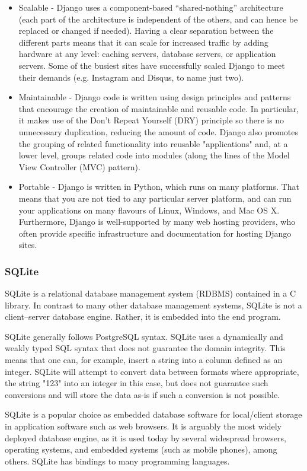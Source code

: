 \documentclass[12pt, a4paper]{report}
\begin{document}
\begin{itemize}
	\item Scalable - Django uses a component-based “shared-nothing” architecture (each part of the architecture is independent of the others, and can hence be replaced or changed if needed). Having a clear separation between the different parts means that it can scale for increased traffic by adding hardware at any level: caching servers, database servers, or application servers. Some of the busiest sites have successfully scaled Django to meet their demands (e.g. Instagram and Disqus, to name just two).
	\item Maintainable - Django code is written using design principles and patterns that encourage the creation of maintainable and reusable code. In particular, it makes use of the Don't Repeat Yourself (DRY) principle so there is no unnecessary duplication, reducing the amount of code. Django also promotes the grouping of related functionality into reusable "applications" and, at a lower level, groups related code into modules (along the lines of the Model View Controller (MVC) pattern).
	\item Portable - Django is written in Python, which runs on many platforms. That means that you are not tied to any particular server platform, and can run your applications on many flavours of Linux, Windows, and Mac OS X. Furthermore, Django is well-supported by many web hosting providers, who often provide specific infrastructure and documentation for hosting Django sites.
\end{itemize}

\subsubsection{SQLite}
SQLite is a relational database management system (RDBMS) contained in a C library. In contrast to many other database management systems, SQLite is not a client–server database engine. Rather, it is embedded into the end program.

\par SQLite generally follows PostgreSQL syntax. SQLite uses a dynamically and weakly typed SQL syntax that does not guarantee the domain integrity. This means that one can, for example, insert a string into a column defined as an integer. SQLite will attempt to convert data between formats where appropriate, the string "123" into an integer in this case, but does not guarantee such conversions and will store the data as-is if such a conversion is not possible.

\par SQLite is a popular choice as embedded database software for local/client storage in application software such as web browsers. It is arguably the most widely deployed database engine, as it is used today by several widespread browsers, operating systems, and embedded systems (such as mobile phones), among others. SQLite has bindings to many programming languages.
\end{document}
